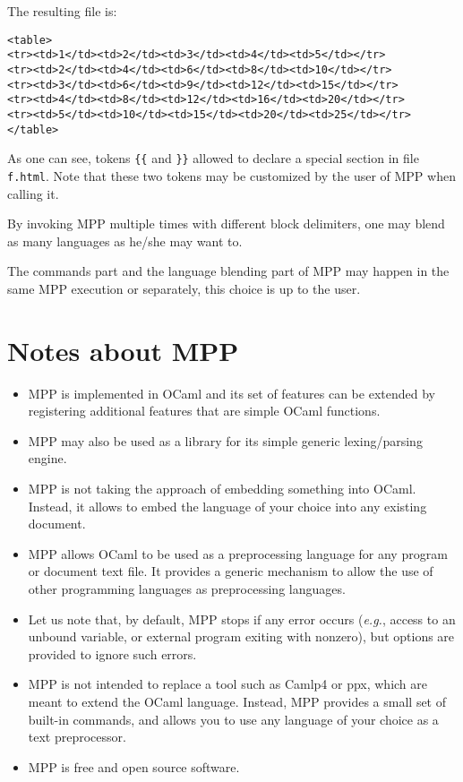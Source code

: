 \documentclass[a4paper]{article}
\def\eg{\emph{e.g.}}
\begin{document}
The resulting file is:
\begin{lstlisting}
<table>
<tr><td>1</td><td>2</td><td>3</td><td>4</td><td>5</td></tr>
<tr><td>2</td><td>4</td><td>6</td><td>8</td><td>10</td></tr>
<tr><td>3</td><td>6</td><td>9</td><td>12</td><td>15</td></tr>
<tr><td>4</td><td>8</td><td>12</td><td>16</td><td>20</td></tr>
<tr><td>5</td><td>10</td><td>15</td><td>20</td><td>25</td></tr>
</table>
\end{lstlisting}

As one  can see, tokens \verb+{{+  and \verb+}}+ allowed  to declare a
special section  in file \texttt{f.html}.  Note that  these two tokens
may be customized by the user of MPP when calling it.

By invoking MPP multiple times with different block delimiters, one
may blend as many languages as he/she may want to.

The commands part and the language  blending part of MPP may happen in
the same MPP execution or separately, this choice is up to the user.



\section{Notes about MPP}
\begin{itemize}
\item MPP is implemented in OCaml and its set of features can be
  extended by registering additional features that are simple OCaml
  functions.

\item MPP may also be used as a library for its simple generic
  lexing/parsing engine.


\item MPP is not taking the approach of embedding something into
  OCaml. Instead, it allows to embed the language of your choice into
  any existing document.


\item MPP allows OCaml to be used as a preprocessing language for any
  program or document text file.  It provides a generic mechanism to
  allow the use of other programming languages as preprocessing
  languages.

\item Let us note that, by default, MPP stops if any error occurs
  (\eg, access to an unbound variable, or external program exiting
  with nonzero), but options are provided to ignore such errors.

\item MPP is not intended to replace a tool such as Camlp4 or ppx,
  which are meant to extend the OCaml language. Instead, MPP provides
  a small set of built-in commands, and allows you to use any language
  of your choice as a text preprocessor.

\item MPP is free and open source software.
\end{itemize}
\end{document}
